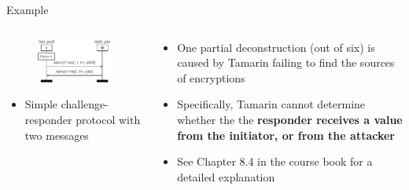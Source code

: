 \documentclass[11pt,aspectratio=169]{beamer}
\begin{document}
\begin{frame}[fragile]{Example}
    \begin{columns}
        \begin{column}{.5\textwidth}
            \begin{figure}
                \includegraphics[width=.8\textwidth]
                    {./figures/lecture_8/sources_1}
            \end{figure}
            \begin{itemize}
                \item[] Simple challenge-responder protocol with two messages
            \end{itemize}
        \end{column}
        \begin{column}{.5\textwidth}
            \begin{itemize}
                \item One partial deconstruction (out of six) is caused by 
                      Tamarin failing to find the sources of encryptions
                \item Specifically, Tamarin cannot determine whether the the 
                      \textbf{responder receives a value from the initiator, or 
                      from the attacker}
                \item See Chapter 8.4 in the course book for a detailed 
                      explanation
            \end{itemize}
        \end{column}
    \end{columns}
    \vsep
\end{frame}
\end{document}
